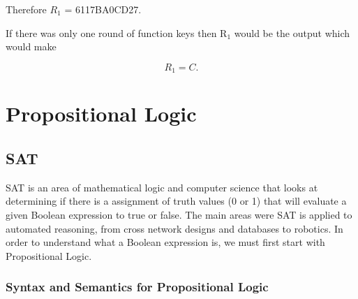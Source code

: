 \documentclass[11pt,a4paper, notitlepage]{report}
\begin{document}
Therefore $R_{1}$ = 6117BA0CD27.

If there was only one round of function keys then R$_{1}$ would be the output which would make

\begin{displaymath}
R_{1} = C.
\end{displaymath}















\chapter{Propositional Logic}
\label{cha:prelim}

\section{SAT}
\label{sec:SAT}
SAT is an area of mathematical logic and computer science that looks at determining if there is a assignment of truth values (0 or 1) that will evaluate a given Boolean expression to true or false. The main areas were SAT is applied to automated reasoning, from cross network designs and databases to robotics. In order to understand what a Boolean expression is, we must first start with Propositional Logic. 


\subsection{Syntax and Semantics for Propositional Logic}
\label{sec:syntaxsem}
\end{document}
